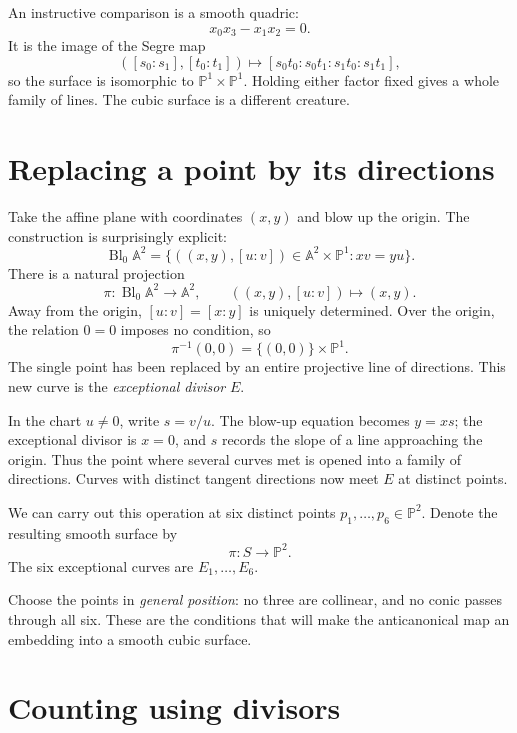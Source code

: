 An instructive comparison is a smooth quadric:
\[
 x_0x_3-x_1x_2=0.
\]
It is the image of the Segre map
\[
 ([s_0:s_1],[t_0:t_1])
 \longmapsto
 [s_0t_0:s_0t_1:s_1t_0:s_1t_1],
\]
so the surface is isomorphic to \(\mathbb P^1\times\mathbb P^1\). Holding either factor fixed gives a whole family of lines. The cubic surface is a different creature.

\section{Replacing a point by its directions}

Take the affine plane with coordinates \((x,y)\) and blow up the origin. The construction is surprisingly explicit:
\begin{equation}
 \operatorname{Bl}_0\mathbb A^2=
 \{((x,y),[u:v])\in\mathbb A^2\times\mathbb P^1:
                         xv=yu\}.
 \label{eq:N20261109-blowup-local}
\end{equation}
There is a natural projection
\[
 \pi:\operatorname{Bl}_0\mathbb A^2\longrightarrow\mathbb A^2,
 \qquad((x,y),[u:v])\longmapsto(x,y).
\]
Away from the origin, \([u:v]=[x:y]\) is uniquely determined. Over the origin, the relation \(0=0\) imposes no condition, so
\[
 \pi^{-1}(0,0)=\{(0,0)\}\times\mathbb P^1.
\]
The single point has been replaced by an entire projective line of directions. This new curve is the \emph{exceptional divisor} \(E\).

In the chart \(u\ne0\), write \(s=v/u\). The blow-up equation becomes \(y=xs\); the exceptional divisor is \(x=0\), and \(s\) records the slope of a line approaching the origin. Thus the point where several curves met is opened into a family of directions. Curves with distinct tangent directions now meet \(E\) at distinct points.

We can carry out this operation at six distinct points \(p_1,\ldots,p_6\in\mathbb P^2\). Denote the resulting smooth surface by
\[
 \pi:S\longrightarrow\mathbb P^2.
\]
The six exceptional curves are \(E_1,\ldots,E_6\).

Choose the points in \emph{general position}: no three are collinear, and no conic passes through all six. These are the conditions that will make the anticanonical map an embedding into a smooth cubic surface.

\section{Counting using divisors}

